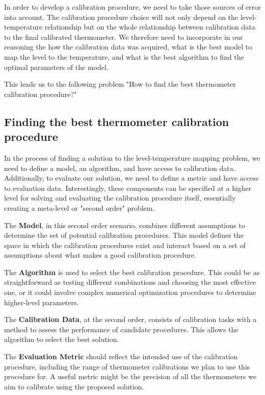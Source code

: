 \begin{bibunit}
In order to develop a calibration procedure, we need to take those sources of error into account. The calibration procedure choice will not only depend on the level-temperature relationship but on the whole relationship between calibration data to the final calibrated thermometer. We therefore need to incorporate in our reasoning the how the calibration data was acquired, what is the best model to map the level to the temperature, and what is the best algorithm to find the optimal parameters of the model.

This leads us to the following problem "How to find the best thermometer calibration procedure?"

\subsection{Finding the best thermometer calibration procedure}
In the process of finding a solution to the level-temperature mapping problem, we need to define a model, an algorithm, and have access to calibration data. Additionally, to evaluate our solution, we need to define a metric and have access to evaluation data. Interestingly, these components can be specified at a higher level for solving and evaluating the calibration procedure itself, essentially creating a meta-level or "second order" problem.

The \textbf{Model}, in this second order scenario, combines different assumptions to determine the set of potential calibration procedures. This model defines the space in which the calibration procedures exist and interact based on a set of assumptions about what makes a good calibration procedure.

The \textbf{Algorithm} is used to select the best calibration procedure. This could be as straightforward as testing different combinations and choosing the most effective one, or it could involve complex numerical optimization procedures to determine higher-level parameters.

The \textbf{Calibration Data}, at the second order, consists of calibration tasks with a method to assess the performance of candidate procedures. This allows the algorithm to select the best solution.

The \textbf{Evaluation Metric} should reflect the intended use of the calibration procedure, including the range of thermometer calibrations we plan to use this procedure for. A useful metric might be the precision of all the thermometers we aim to calibrate using the proposed solution.


\end{bibunit}
